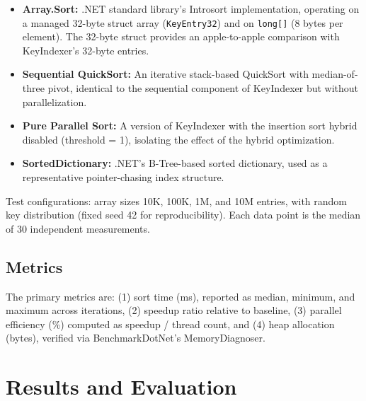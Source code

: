 \documentclass[conference]{IEEEtran}
\begin{document}
\begin{itemize}[nosep]
    \item \textbf{Array.Sort:} .NET standard library's Introsort implementation, operating on a managed 32-byte struct array (\texttt{KeyEntry32}) and on \texttt{long[]} (8 bytes per element). The 32-byte struct provides an apple-to-apple comparison with KeyIndexer's 32-byte entries.
    \item \textbf{Sequential QuickSort:} An iterative stack-based QuickSort with median-of-three pivot, identical to the sequential component of KeyIndexer but without parallelization.
    \item \textbf{Pure Parallel Sort:} A version of KeyIndexer with the insertion sort hybrid disabled (threshold = 1), isolating the effect of the hybrid optimization.
    \item \textbf{SortedDictionary:} .NET's B-Tree-based sorted dictionary, used as a representative pointer-chasing index structure.
\end{itemize}

Test configurations: array sizes 10K, 100K, 1M, and 10M entries, with random key distribution (fixed seed 42 for reproducibility). Each data point is the median of 30 independent measurements.

\subsection{Metrics}
\label{sec:metrics}

The primary metrics are: (1) sort time (ms), reported as median, minimum, and maximum across iterations, (2) speedup ratio relative to baseline, (3) parallel efficiency (\%) computed as speedup / thread count, and (4) heap allocation (bytes), verified via BenchmarkDotNet's MemoryDiagnoser.

\section{Results and Evaluation}
\label{sec:results}

\end{document}
